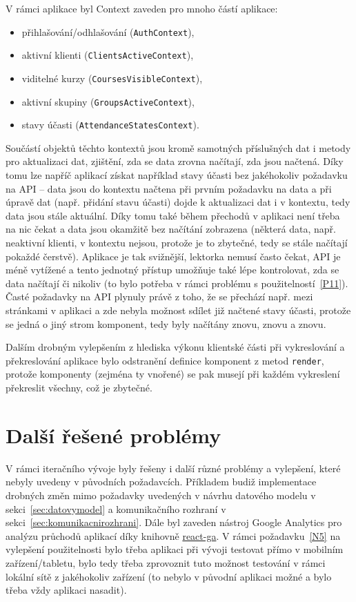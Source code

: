 V rámci aplikace byl Context zaveden pro mnoho částí aplikace:
\begin{itemize}
    \item přihlašování/odhlašování (\verb|AuthContext|),
    \item aktivní klienti (\verb|ClientsActiveContext|),
    \item viditelné kurzy (\verb|CoursesVisibleContext|),
    \item aktivní skupiny (\verb|GroupsActiveContext|),
    \item stavy účasti (\verb|AttendanceStatesContext|).
\end{itemize}

Součástí objektů těchto kontextů jsou kromě samotných příslušných dat i metody pro aktualizaci dat, zjištění, zda se data zrovna načítají, zda jsou načtená. Díky tomu lze napříč aplikací získat například stavy účasti bez jakéhokoliv požadavku na API -- data jsou do kontextu načtena při prvním požadavku na data a při úpravě dat (např. přidání stavu účasti) dojde k aktualizaci dat i v kontextu, tedy data jsou stále aktuální. Díky tomu také během přechodů v aplikaci není třeba na nic čekat a data jsou okamžitě bez načítání zobrazena (některá data, např. neaktivní klienti, v kontextu nejsou, protože je to zbytečné, tedy se stále načítají pokaždé čerstvě). Aplikace je tak svižnější, lektorka nemusí často čekat, API je méně vytížené a tento jednotný přístup umožňuje také lépe kontrolovat, zda se data načítají či nikoliv (to bylo potřeba v rámci problému s použitelností~\ref{P11}). Časté požadavky na API plynuly právě z toho, že se přechází např. mezi stránkami v aplikaci a zde nebyla možnost sdílet již načtené stavy účasti, protože se jedná o jiný strom komponent, tedy byly načítány znovu, znovu a znovu.

Dalším drobným vylepšením z hlediska výkonu klientské části při vykreslování a překreslování aplikace bylo odstranění definice komponent z metod \verb|render|, protože komponenty (zejména ty vnořené) se pak musejí při každém vykreslení překreslit všechny, což je zbytečné.

\section{Další řešené problémy}\label{sec:dalsireseneproblemy}

V rámci iteračního vývoje byly řešeny i další různé problémy a vylepšení, které nebyly uvedeny v původních požadavcích. Příkladem budiž implementace drobných změn mimo požadavky uvedených v návrhu datového modelu v sekci~\ref{sec:datovymodel} a komunikačního rozhraní v sekci~\ref{sec:komunikacnirozhrani}. Dále byl zaveden nástroj Google Analytics pro analýzu průchodů aplikací díky knihovně \href{https://github.com/react-ga/react-ga}{react-ga}. V rámci požadavku~\ref{N5} na vylepšení použitelnosti bylo třeba aplikaci při vývoji testovat přímo v mobilním zařízení/tabletu, bylo tedy třeba zprovoznit tuto možnost testování v rámci lokální sítě z jakéhokoliv zařízení (to nebylo v původní aplikaci možné a bylo třeba vždy aplikaci nasadit).

